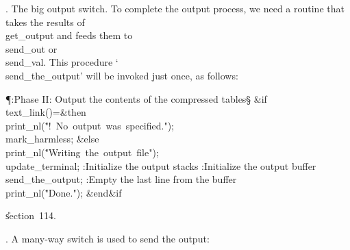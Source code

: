 .  The big output switch.
To complete the output process, we need a routine that takes the results
of \\{get\_output} and feeds them to \\{send\_out} or \\{send\_val}.
This procedure `\\{send\_the\_output}' will be invoked just once, as follows:

\Y\P\?\4:Phase II: Output the contents of the compressed tables\X\S\?\6
\&{if}\1\1\8\\{text\_link}\?\1(\?\2)=\2\8\&{then}\6
\\{print\_nl}\?\1(\?\.{"!\ No\ output\ was\ specified."}\?\2)\?;\5
\\{mark\_harmless};\6
\4\&{else}\6
\\{print\_nl}\?\1(\?\.{"Writing\ the\ output\ file"}\?\2)\?;\5
\\{update\_terminal};\6
:Initialize the output stacks\X\6
:Initialize the output buffer\X\6
\\{send\_the\_output};\6
:Empty the last line from the buffer\X\6
\\{print\_nl}\?\1(\?\.{"Done."}\?\2)\?;\2\6
\&{end}\8\2\&{if}\1\par
\U section~114.\fi

. A many-way switch is used to send the output:

